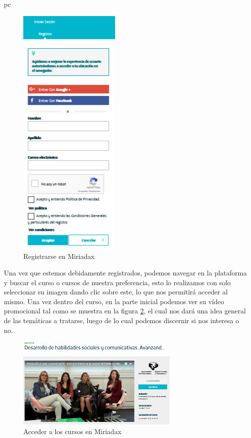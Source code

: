 pc\documentclass[a4paper,12pt,openany]{book}
\begin{document}
\begin{figure}[ht]
  \centering
	\includegraphics[width=5cm]{miriada7.png}
\caption{Registrarse en Miriadax}
  \label{fig:miriada7}
\end{figure}

Una vez que estemos debidamente registrados, podemos navegar en la plataforma y buscar el curso o cursos de nuestra preferencia, esto lo realizamos con solo seleccionar su imagen dando clic sobre este, lo que nos permitirá acceder al mismo. Una vez dentro del curso, en la parte inicial podemos ver su vídeo promocional tal como se muestra en la figura \ref{fig:miriada4}, el cual nos dará una idea general de las temáticas a tratarse, luego de lo cual podemos discernir si nos interesa o no. 

\begin{figure}[ht]
  \centering
	\includegraphics[width=8cm]{miriada4.png}
\caption{Acceder a los cursos en Miriadax}
  \label{fig:miriada4}
\end{figure}
\end{document}
